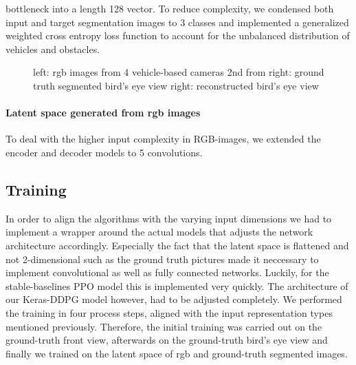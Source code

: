\documentclass[letterpaper, 10 pt, conference]{ieeeconf}  %
\begin{document}
bottleneck into a length 128 vector. To reduce complexity, we condensed both input and target segmentation images to 3 classes 
and implemented a generalized weighted cross entropy\cite{zhangGeneralizedCrossEntropy2018} loss function to 
account for the unbalanced distribution of vehicles and obstacles.
\begin{figure}[thpb]
   \centering
   \caption{left: rgb images from 4 vehicle-based cameras
            \newline 2nd from right: ground truth segmented bird's eye view
            \newline right: reconstructed bird's eye view}
       \label{figurelabel} 
       \end{figure}

\paragraph{Latent space generated from rgb images} To deal with the higher input complexity in RGB-images, we extended the
encoder and decoder models to 5 convolutions.
       
\subsection{Training}
In order to align the algorithms with the varying input dimensions we had to implement a wrapper around the actual models that adjusts the network architecture accordingly. Especially the fact that the latent space is flattened and not 2-dimensional such as the ground truth pictures made it neccessary to implement convolutional as well as  fully connected networks. Luckily, for the stable-baselines PPO model this is implemented very quickly. The architecture of our Keras-DDPG model however, had to be adjusted completely. 
We performed the training in four process steps, aligned with the input representation types mentioned previously. Therefore, the initial training was carried out on the ground-truth front view, afterwards on the ground-truth bird's eye view and finally we trained on the latent space of rgb and ground-truth segmented images. 
\end{document}
